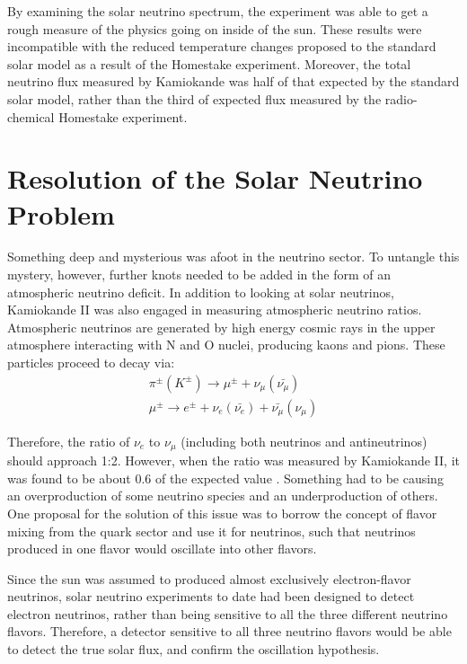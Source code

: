 By examining the solar neutrino spectrum, the experiment was able to get a rough measure of the physics going on inside of the sun. These results were incompatible with the reduced temperature changes proposed to the standard solar model as a result of the Homestake experiment. Moreover, the total neutrino flux measured by Kamiokande was half of that expected by the standard solar model, rather than the third of expected flux measured by the radio-chemical Homestake experiment. 

\section{Resolution of the Solar Neutrino Problem}

Something deep and mysterious was afoot in the neutrino sector. To untangle this mystery, however, further knots needed to be added in the form of an atmospheric neutrino deficit. In addition to looking at solar neutrinos, Kamiokande II was also engaged in measuring atmospheric neutrino ratios. Atmospheric neutrinos are generated by high energy cosmic rays in the upper atmosphere interacting with N and O nuclei,  producing kaons and pions. These particles  proceed to decay via:
\begin{eqnarray}
 \pi^{\pm} (K^{\pm}) \rightarrow \mu^{\pm} + \nu_{\mu}(\bar{\nu_{\mu}})\\
 \mu^{\pm} \rightarrow e^{\pm} + \nu_e(\bar{\nu_e}) + \bar{\nu_{\mu}}(\nu_{\mu})
 \end{eqnarray} 

Therefore, the ratio of $\nu_{e}$ to $\nu_{\mu}$ (including both neutrinos and antineutrinos) should approach 1:2. However, when the ratio was measured by Kamiokande II, it was found to be about 0.6 of the expected value \cite{SuperK}. Something had to be causing an overproduction of some neutrino species and an underproduction of others. One proposal for the solution of this issue was to borrow the concept of flavor mixing from the quark sector and use it for neutrinos, such that neutrinos produced in one flavor would oscillate into other flavors. 

Since the sun was assumed to produced almost exclusively electron-flavor neutrinos, solar neutrino experiments to date had been designed to detect electron neutrinos, rather than being sensitive to all the three different neutrino flavors. Therefore, a detector sensitive to all three neutrino flavors would be able to detect the true solar flux, and confirm the oscillation hypothesis. 


